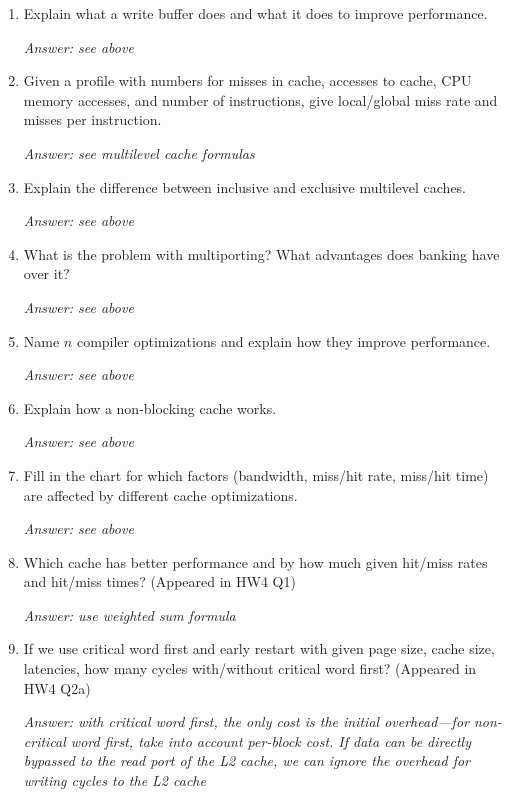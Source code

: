 \documentclass{article}
\begin{document}
\begin{enumerate}

\item Explain what a write buffer does and what it does to improve performance.

\textit{Answer: see above}

\item Given a profile with numbers for misses in cache, accesses to cache, CPU memory accesses, and number of instructions, give local/global miss rate and misses per instruction.

\textit{Answer: see multilevel cache formulas}

\item Explain the difference between inclusive and exclusive multilevel caches.

\textit{Answer: see above}

\item What is the problem with multiporting? What advantages does banking have over it?

\textit{Answer: see above}

\item Name $n$ compiler optimizations and explain how they improve performance.

\textit{Answer: see above}

\item Explain how a non-blocking cache works.

\textit{Answer: see above}

\item Fill in the chart for which factors (bandwidth, miss/hit rate, miss/hit time) are affected by different cache optimizations.

\textit{Answer: see above}

\item Which cache has better performance and by how much given hit/miss rates and hit/miss times? (Appeared in HW4 Q1)

\textit{Answer: use weighted sum formula}

\item If we use critical word first and early restart with given page size, cache size, latencies, how many cycles with/without critical word first? (Appeared in HW4 Q2a)

\textit{Answer: with critical word first, the only cost is the initial overhead---for non-critical word first, take into account per-block cost. If data can be directly bypassed to the read port of the L2 cache, we can ignore the overhead for writing cycles to the L2 cache}


\end{enumerate}
\end{document}
